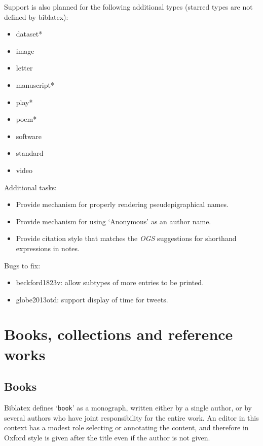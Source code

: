 \documentclass[extrafontsizes,11pt,a4paper,oneside]{memoir}
\newcommand*{\code}[1]{`\texttt{#1}'}
\begin{document}
Support is also planned for the following additional types (starred types are not defined by \textsf{biblatex}):

\begin{multicols}{2}
  \begin{itemize}\firmlist
    \item dataset*
    \item image
    \item letter
    \item manuscript*
    \item play*
    \item poem*
    \item software
    \item standard
    \item video
  \end{itemize}
\end{multicols}

Additional tasks:

\begin{itemize}
  \item Provide mechanism for properly rendering pseudepigraphical names.
  \item Provide mechanism for using ‘Anonymous’ as an author name.
  \item Provide citation style that matches the \emph{OGS} suggestions for shorthand expressions in notes.
\end{itemize}

Bugs to fix:

\begin{itemize}
  \item beckford1823v: allow subtypes of more entries to be printed.
  \item globe2013otd: support display of time for tweets.
\end{itemize}

\chapter{Books, collections and reference works}\label{sec:book}

\section{Books}

Biblatex defines \code{book} as a monograph, written either by a single author, or by several authors who have joint responsibility for the entire work. An editor in this context has a modest role selecting or annotating the content, and therefore in Oxford style is given after the title even if the author is not given.
\end{document}
